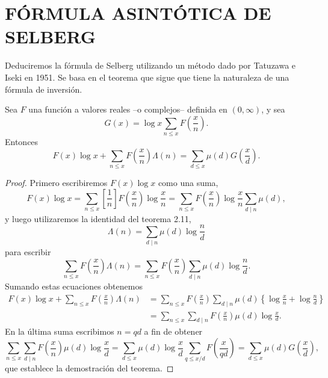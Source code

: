 \documentclass[12pt,a4paper]{book}
\begin{document}
    \section{FÓRMULA ASINTÓTICA DE SELBERG}

    Deduciremos la fórmula de Selberg utilizando un método dado por Tatuzawa e Iseki
    en 1951. Se basa en el teorema que sigue que tiene la naturaleza de una fórmula
    de inversión.

    \begin{teorema}
        Sea $F$ una función a valores reales --o complejos-- definida en $(0,\infty)$,
        y sea
        \begin{equation*}
            G(x)=\log x\sum_{n\leq x}F\left(\frac{x}{n}\right).
        \end{equation*}
        Entonces
        \begin{equation*}
            F(x)\log x+\sum_{n\leq x}F\left(\frac{x}{n}\right)\Lambda(n)
            =\sum_{d\leq x}\mu(d)G\left(\frac{x}{d}\right).
        \end{equation*}
    \end{teorema}

    \begin{proof}
        Primero escribiremos $F(x)\log x$ como una suma,
        \begin{equation*}
            F(x)\log x=\sum_{n\leq x}\left[\frac{1}{n}\right]F\left(\frac{x}{n}\right)\log\frac{x}{n}
            =\sum_{n\leq x}F\left(\frac{x}{n}\right)\log\frac{x}{n}\sum_{d\mid n}\mu(d),
        \end{equation*}
        y luego utilizaremos la identidad del teorema 2.11,
        \begin{equation*}
            \Lambda(n)=\sum_{d\mid n}\mu(d)\log\frac{n}{d}
        \end{equation*}
        para escribir
        \begin{equation*}
            \sum_{n\leq x}F\left(\frac{x}{n}\right)\Lambda(n)
            =\sum_{n\leq x}F\left(\frac{x}{n}\right)\sum_{d\mid n}\mu(d)\log\frac{n}{d}.
        \end{equation*}
        Sumando estas ecuaciones obtenemos
        \begin{align*}
            F(x)\log x+\sum_{n\leq x}F\left(\frac{x}{n}\right)\Lambda(n)
            &=\sum_{n\leq x}F\left(\frac{x}{n}\right)\sum_{d\mid n}\mu(d)
            \left\{\log\frac{x}{n}+\log\frac{n}{d}\right\}\\
            &=\sum_{n\leq x}\sum_{d\mid n}F\left(\frac{x}{n}\right)\mu(d)\log\frac{x}{d}.
        \end{align*}
        En la última suma escribimos $n=qd$ a fin de obtener
        \begin{equation*}
            \sum_{n\leq x}\sum_{d\mid n}F\left(\frac{x}{n}\right)\mu(d)\log\frac{x}{d}
            =\sum_{d\leq x}\mu(d)\log\frac{x}{d}\sum_{q\leq x/d}F\left(\frac{x}{qd}\right)
            =\sum_{d\leq x}\mu(d)G\left(\frac{x}{d}\right),
        \end{equation*}
        que establece la demostración del teorema.
    \end{proof}
\end{document}
